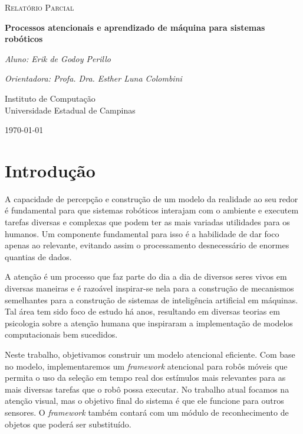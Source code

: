 \documentclass[article]{IEEEtran}
\newcommand{\tit}[1]{\textit{#1}}
\begin{document}

\begin{titlepage}
	\centering
	{\scshape\Large Relatório Parcial\par}
	\vspace{1.5cm}
	{\huge\bfseries Processos atencionais e aprendizado de máquina
		para sistemas robóticos\par}
	\vspace{1cm}
	{\itshape Aluno: Erik de Godoy Perillo\par}
	{\itshape Orientadora: Profa. Dra. Esther Luna Colombini\par}
	\vspace{0.5cm}
	\vfill
    Instituto de Computação\\
	Universidade Estadual de Campinas
	\vfill
	{\large \today\par}
\end{titlepage}

\newpage

\section{Introdução}
A capacidade de percepção e construção de um modelo da realidade ao seu redor
é fundamental para que sistemas robóticos interajam com o ambiente e executem
tarefas diversas e complexas que podem ter as mais variadas utilidades para
os humanos.
Um componente fundamental para isso é a habilidade de dar foco apenas ao
relevante, evitando assim o processamento desnecessário de enormes quantias
de dados.

A atenção é um processo que faz parte do dia a dia de diversos seres vivos
em diversas maneiras e é razoável inspirar-se nela para a construção de
mecanismos semelhantes para a construção de sistemas de inteligência
artificial em máquinas.
Tal área tem sido foco de estudo há anos, resultando em diversas teorias
em psicologia sobre a atenção humana que inspiraram a implementação de
modelos computacionais bem sucedidos.

Neste trabalho, objetivamos construir um modelo atencional eficiente.
Com base no modelo, implementaremos um \tit{framework} atencional para
robôs móveis que permita o uso da seleção em tempo real dos estímulos
mais relevantes para as mais diversas tarefas que o robô possa executar.
No trabalho atual focamos na atenção visual, mas o objetivo
final do sistema é que ele funcione para outros sensores.
O \tit{framework} também contará com um módulo de reconhecimento de objetos
que poderá ser substituído.
\end{document}
